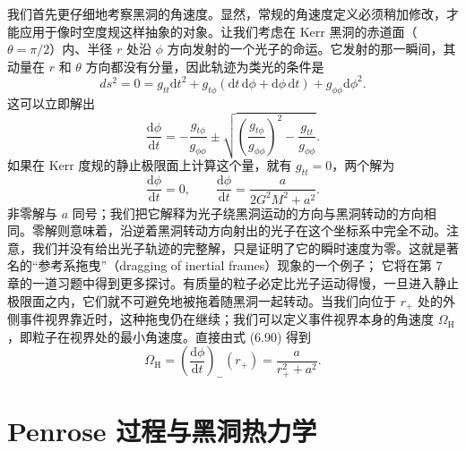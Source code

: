 我们首先更仔细地考察黑洞的角速度。显然，常规的角速度定义必须稍加修改，才能应用于像时空度规这样抽象的对象。让我们考虑在 Kerr 黑洞的赤道面（$\theta=\pi/2$）内、半径 $r$ 处沿 $\phi$ 方向发射的一个光子的命运。它发射的那一瞬间，其动量在 $r$ 和 $\theta$ 方向都没有分量，因此轨迹为类光的条件是
\begin{equation*}
ds^{2} = 0 = g_{tt}\mathrm{d}t^{2} + g_{t\phi}\left(\mathrm{d}t\,\mathrm{d}\phi + \mathrm{d}\phi\,\mathrm{d}t\right) + g_{\phi\phi}\mathrm{d}\phi^{2}.
\tag{6.89}
\end{equation*}
这可以立即解出
\begin{equation*}
\frac{\mathrm{d}\phi}{\mathrm{d}t} = -\frac{g_{t\phi}}{g_{\phi\phi}} \pm \sqrt{\left(\frac{g_{t\phi}}{g_{\phi\phi}}\right)^{2} - \frac{g_{tt}}{g_{\phi\phi}}}.
\tag{6.90}
\end{equation*}
如果在 Kerr 度规的静止极限面上计算这个量，就有 $g_{tt}=0$，两个解为
\begin{equation*}
\frac{\mathrm{d}\phi}{\mathrm{d}t} = 0,\qquad \frac{\mathrm{d}\phi}{\mathrm{d}t} = \frac{a}{2G^{2}M^{2}+a^{2}}.
\tag{6.91}
\end{equation*}
非零解与 $a$ 同号；我们把它解释为光子绕黑洞运动的方向与黑洞转动的方向相同。零解则意味着，沿逆着黑洞转动方向射出的光子在这个坐标系中完全不动。注意，我们并没有给出光子轨迹的完整解，只是证明了它的瞬时速度为零。这就是著名的“参考系拖曳”（dragging of inertial frames）现象的一个例子；
它将在第 7 章的一道习题中得到更多探讨。有质量的粒子必定比光子运动得慢，一旦进入静止极限面之内，它们就不可避免地被拖着随黑洞一起转动。当我们向位于 $r_{+}$ 处的外侧事件视界靠近时，这种拖曳仍在继续；我们可以定义事件视界本身的角速度 $\Omega_{\mathrm{H}}$，即粒子在视界处的最小角速度。直接由式 (6.90) 得到
\begin{equation*}
\Omega_{\mathrm{H}} = \left(\frac{\mathrm{d}\phi}{\mathrm{d}t}\right)_{-}(r_{+}) = \frac{a}{r_{+}^{2}+a^{2}}.
\tag{6.92}
\end{equation*}

\section{Penrose 过程与黑洞热力学}

